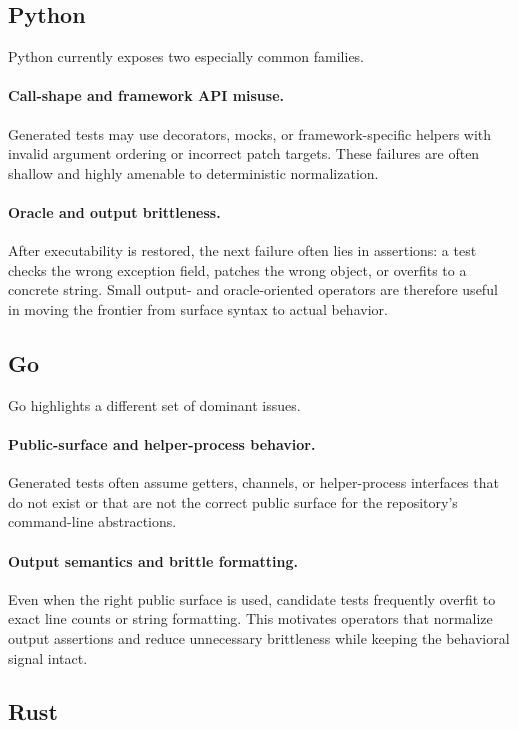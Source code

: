 \documentclass[10pt]{article}
\begin{document}
\subsection{Python}

Python currently exposes two especially common families.

\paragraph{Call-shape and framework API misuse.}
Generated tests may use decorators, mocks, or framework-specific helpers with invalid argument ordering or incorrect patch targets. These failures are often shallow and highly amenable to deterministic normalization.

\paragraph{Oracle and output brittleness.}
After executability is restored, the next failure often lies in assertions: a test checks the wrong exception field, patches the wrong object, or overfits to a concrete string. Small output- and oracle-oriented operators are therefore useful in moving the frontier from surface syntax to actual behavior.

\subsection{Go}

Go highlights a different set of dominant issues.

\paragraph{Public-surface and helper-process behavior.}
Generated tests often assume getters, channels, or helper-process interfaces that do not exist or that are not the correct public surface for the repository's command-line abstractions.

\paragraph{Output semantics and brittle formatting.}
Even when the right public surface is used, candidate tests frequently overfit to exact line counts or string formatting. This motivates operators that normalize output assertions and reduce unnecessary brittleness while keeping the behavioral signal intact.

\subsection{Rust}
\end{document}
